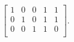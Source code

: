 $$
\left[
\begin{array}{*{5}{c}}
1 & 0 & 0 & 1 & 1\\
0 & 1 & 0 & 1 & 1\\
0 & 0 & 1 & 1 & 0\\
\end{array}
\right].
$$
